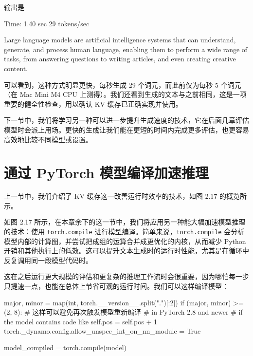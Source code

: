 输出是

\begin{codebox}
Time: 1.40 sec
29 tokens/sec

 Large language models are artificial intelligence systems that can
understand, generate, and process human language, enabling them to
perform a wide range of tasks, from answering questions to writing
articles, and even creating creative content.
\end{codebox}

可以看到，这种方式明显更快，每秒生成 29 个词元，而此前仅为每秒 5 个词元（在 Mac Mini M4 CPU 上测得）。我们还看到生成的文本与之前相同，这是一项重要的健全性检查，用以确认 KV 缓存已正确实现并使用。

下一节中，我们将学习另一种可以进一步提升生成速度的技术，它在后面几章评估模型时会派上用场。更快的生成让我们能在更短的时间内完成更多评估，也更容易高效地比较不同模型或设置。

\section{通过 PyTorch 模型编译加速推理}

上一节中，我们介绍了 KV 缓存这一改善运行时效率的技术，如图 2.17 的概览所示。


如图 2.17 所示，在本章余下的这一节中，我们将应用另一种能大幅加速模型推理的技术：使用 \texttt{torch.compile} 进行模型编译。简单来说，\texttt{torch.compile} 会分析模型内部的计算图，并尝试把成组的运算合并成更优化的内核，从而减少 Python 开销和其他执行上的低效。这可以提升文本生成时的运行时性能，尤其是在循环中反复调用同一段模型代码时。

这在之后运行更大规模的评估和更复杂的推理工作流时会很重要，因为哪怕每一步只提速一点，也能在总体上节省可观的运行时间。我们可以这样编译模型：

\begin{codebox}
major, minor = map(int, torch.__version__.split(".")[:2])
if (major, minor) >= (2, 8):
    # 这样可以避免再次触发模型重新编译
    # in PyTorch 2.8 and newer
    # if the model contains code like self.pos = self.pos + 1
    torch._dynamo.config.allow_unspec_int_on_nn_module = True

model_compiled = torch.compile(model)
\end{codebox}

